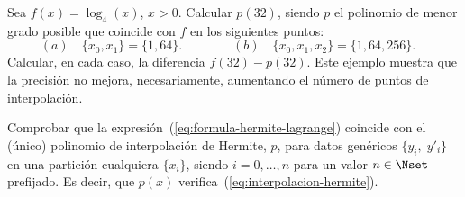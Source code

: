 \begin{EjerciciosPropuestos}
  \begin{problema}
    Sea $f(x)=\log_4(x)$, $x>0$. Calcular $p(32)$, siendo $p$ el
    polinomio de menor grado posible que coincide con $f$ en los
    siguientes puntos:
    \begin{equation*}
      (a) \quad \{x_0,x_1\}=\{1,64\}. \qquad\qquad
      (b) \quad \{x_0,x_1,x_2\}=\{1,64,256\}.
      \quad
    \end{equation*}
    Calcular, en cada caso, la diferencia $f(32)-p(32)$. Este ejemplo
    muestra que la precisión no mejora, necesariamente, aumentando el
    número de puntos de interpolación.
  \end{problema}

  \begin{problema}
    Comprobar que la expresión~(\ref{eq:formula-hermite-lagrange})
    coincide con el (único) polinomio de interpolación de Hermite,
    $p$, para datos genéricos $\{y_i,\; y'_i\}$ en una partición
    cualquiera $\{x_i\}$, siendo $i=0,\dots,n$ para un valor
    $n\in\Nset$ prefijado.  Es decir, que $p(x)$
    verifica~(\ref{eq:interpolacion-hermite}).
  \end{problema}

\end{EjerciciosPropuestos}

